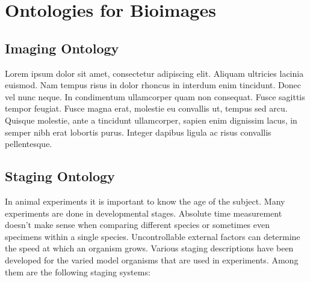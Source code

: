 
\chapter{Ontologies for Bioimages} %

\label{Chapter 3} %



\section{Imaging Ontology}

Lorem ipsum dolor sit amet, consectetur adipiscing elit. Aliquam ultricies lacinia euismod. Nam tempus risus in dolor rhoncus in interdum enim tincidunt. Donec vel nunc neque. In condimentum ullamcorper quam non consequat. Fusce sagittis tempor feugiat. Fusce magna erat, molestie eu convallis ut, tempus sed arcu. Quisque molestie, ante a tincidunt ullamcorper, sapien enim dignissim lacus, in semper nibh erat lobortis purus. Integer dapibus ligula ac risus convallis pellentesque.


\section{Staging Ontology}

In animal experiments it is important to know the age of the subject. Many experiments are done in developmental stages. Absolute time measurement doesn't make sense when comparing different species or sometimes even specimens within a single species. Uncontrollable external factors can determine the speed at which an organism grows. Various staging descriptions have been developed for the varied model organisms that are used in experiments. Among them are the following staging systems:

